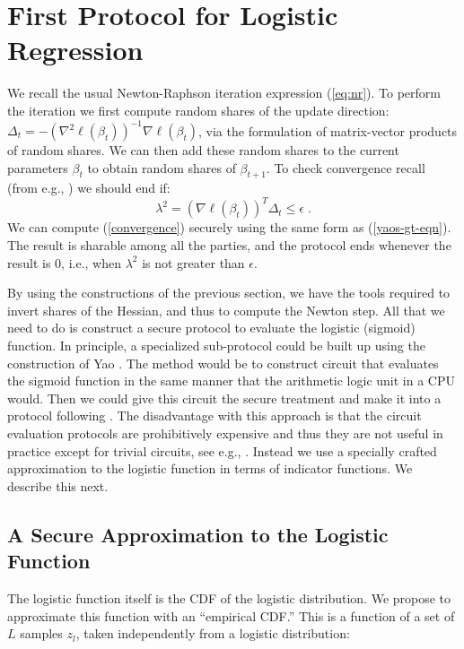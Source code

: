 \documentclass[11pt]{article}
\begin{document}
\section{First Protocol for Logistic Regression}\label{sec:protocol1}


We recall the usual Newton-Raphson iteration expression (\ref{eq:nr}). 
To perform the iteration  we first  compute random shares of the update direction: $\Delta_t = -(\nabla^2\ell(\beta_t))^{-1} \nabla\ell (\beta_t)$,
\noindent via the formulation of matrix-vector products of random shares.  We can then add these random shares to the current parameters $\beta_t$ to obtain random shares of $\beta_{t+1}$.  To check convergence recall (from e.g., \cite{cvx_book}) we should end if:
\begin{equation}\label{convergence}
\lambda^2 = (\nabla\ell(\beta_t))^T\Delta_t \leq \epsilon \; .
\end{equation}
We can compute (\ref{convergence}) securely using the same form as (\ref{yaos-gt-eqn}).  The result is sharable among all the parties, and the protocol ends whenever the result is 0, i.e., when $\lambda^2$ is not greater than $\epsilon$.



By using the constructions of the previous section, we have the tools required to invert shares of the Hessian, and thus to compute the Newton step.  All that we need to do is  construct a secure protocol to evaluate the logistic (sigmoid) function.  In principle, a specialized sub-protocol could be built up using the construction of Yao \cite{yao82}.  The method would be to construct circuit that evaluates the sigmoid function in the same manner that the arithmetic logic unit in a CPU would.  Then we could give this circuit the secure treatment and make it into a protocol following \citet{goldreich}.  The disadvantage with this approach is that the circuit evaluation protocols are prohibitively expensive and thus they are not  useful in practice except for trivial circuits, see e.g.,  \citet{fairplay}.   Instead we use a specially crafted approximation to the logistic function in terms of indicator functions.  We describe this next.

\subsection{A Secure Approximation to the Logistic Function}\label{sec:RS_of_sigma}

The logistic function itself is the CDF of the logistic distribution.  We propose to approximate this function with an ``empirical CDF.''  This is a function of a set of $L$ samples $z_l$, taken independently from a logistic distribution:
\end{document}
